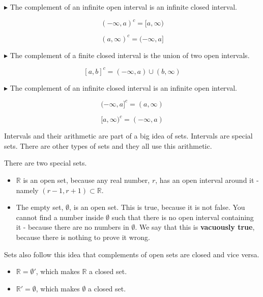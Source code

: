 \documentclass{ximera}
\begin{document}
$\blacktriangleright$ The complement of an infinite open interval is an infinite closed interval.

\[     (-\infty, a)^{c} = [a, \infty)          \]

\[     (a, \infty)^{c} = (-\infty, a]          \]



$\blacktriangleright$ The complement of a finite closed interval is the union of two open intervals.

\[    [a,b]^{c}  = (-\infty, a) \cup (b, \infty)          \]



$\blacktriangleright$ The complement of an infinite closed interval is an infinite open interval.

\[     (-\infty, a]^{c} = (a, \infty)          \]

\[     [a, \infty)^{c} = (-\infty, a)          \]









Intervals and their arithmetic are part of a big idea of sets.  Intervals are special sets.  There are other types of sets and they all use this arithmetic.

There are two special sets.

\begin{itemize}
\item $\mathbb{R}$  is an open set, because any real number, $r$, has an open interval around it - namely $(r-1, r+1) \subset \mathbb{R}$.
\item The empty set, $\emptyset$, is an open set.  This is true, because it is not false.  You cannot find a number inside $\emptyset$ such that there is no open interval containing it - because there are no numbers in $\emptyset$.  We say that this is \textbf{vacuously true}, because there is nothing to prove it wrong.
\end{itemize}





Sets also follow this idea that complements of open sets are closed and vice versa.

\begin{itemize}
\item $\mathbb{R} = \emptyset'$, which makes $\mathbb{R}$ a closed set.
\item $\mathbb{R}' = \emptyset$, which makes $\emptyset$ a closed set.
\end{itemize}
\end{document}

